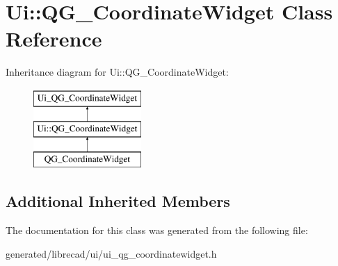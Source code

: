 \hypertarget{classUi_1_1QG__CoordinateWidget}{\section{Ui\-:\-:Q\-G\-\_\-\-Coordinate\-Widget Class Reference}
\label{classUi_1_1QG__CoordinateWidget}
}
Inheritance diagram for Ui\-:\-:Q\-G\-\_\-\-Coordinate\-Widget\-:\begin{figure}[H]
\begin{center}
\leavevmode
\includegraphics[height=3.000000cm]{classUi_1_1QG__CoordinateWidget}
\end{center}
\end{figure}
\subsection*{Additional Inherited Members}


The documentation for this class was generated from the following file\-:\begin{DoxyCompactItemize}
\item 
generated/librecad/ui/ui\-\_\-qg\-\_\-coordinatewidget.\-h\end{DoxyCompactItemize}
